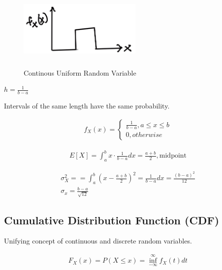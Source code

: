 \documentclass{article}
\begin{document}
\begin{figure}[h]
\centering
\includegraphics[width=6cm, height=4cm]{images/L08/continuous_unif_pdf.jpeg}
\caption{Continous Uniform Random Variable}
\end{figure}

$h=\frac{1}{b-a}$

Intervals of the same length have the same probability.

\begin{align*}
f_X(x)=\begin{cases}\frac{1}{b-a}, a \le x \le b\\
        0, otherwise
        \end{cases}
\end{align*}

\begin{align*}
E[X] = \int_a^b x\cdot \frac{1}{b-a}dx = \frac{a+b}{2}, \text{midpoint}
\end{align*}

\begin{align*}
\sigma_X^2= = \int_a^b (x - \frac{a+b}{2})^2 = \frac{1}{b-a}dx = \frac{(b-a)^2}{12}\\
\sigma_x = \frac{b-a}{\sqrt{12}}
\end{align*}

\subsection{Cumulative Distribution Function (CDF)}


Unifying concept of continuous and discrete random variables.

\begin{align*}
F_X(x) = P(X \le x) = \inf_{-\infty}^{\infty} f_X(t)dt
\end{align*}
\end{document}
